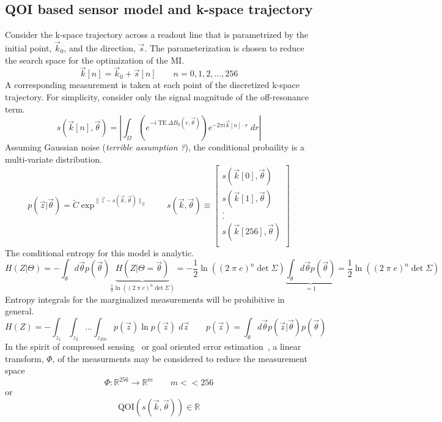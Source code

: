 \documentclass[10pt]{amsart}
\begin{document}
\subsection{QOI based sensor model and k-space trajectory}
Consider the k-space trajectory across a readout line that is
parametrized by the initial point, $\vec{k}_0$, and the direction, $\vec{s}$.
The parameterization is chosen to reduce the search space for the
optimization of the MI.
\[
   \vec{k}[n] = \vec{k}_0 +  \vec{s} [n] \qquad n = 0, 1, 2, ..., 256 
\]
A corresponding measurement is taken at each point of the
discretized k-space trajectory. For simplicity, consider only the
signal magnitude of the off-resonance term.
\[
 s(\vec{k}[n], \vec{\theta} ) 
          =  \left| 
     \int_\Omega \left(
     e^{- i\; \text{TE} \; \Delta B_{0}(r, \vec{\theta} ) }
           \right)
          e^{-2  \pi i \vec{k}[n]  \cdot r } 
             \; dr
             \right| 
\]
Assuming Gaussian noise (\textit{terrible assumption ?}), 
the conditional probaility is a multi-variate distribution.
\[
  p(\vec{z}|\vec{\theta}) = 
    \tilde{C} \exp^{\|\vec{z}- s(\vec{k},\vec{\theta} ) \|_\Sigma}
  \qquad
   s(\vec{k},\vec{\theta} )  \equiv
\begin{bmatrix}
  s(\vec{k}[ 0]  , \vec{\theta}  ) \\
  s(\vec{k}[ 1]  , \vec{\theta}  ) \\
   .                         \\
   .                         \\
  s(\vec{k}[ 256], \vec{\theta}  ) \\
\end{bmatrix}
\]
The conditional entropy for this model is analytic.
\[
H(Z|\Theta) =
     - 
       \int_{\theta}  d \vec{\theta}
       p(\vec{\theta}) 
       \underbrace{ 
       H(Z|\Theta = \vec{\theta}) }_{
          \frac{1}{2} \ln \left((2 \; \pi \; e)^n \det \Sigma   \right) 
         }
     = 
     - \frac{1}{2} \ln \left((2 \; \pi \; e)^n  \det \Sigma \right) 
       \underbrace{ 
       \int_{\theta}  d \vec{\theta}
       p(\vec{\theta}) 
        }_{ = 1}
     = 
          \frac{1}{2} \ln \left((2 \; \pi \; e)^n   \det\Sigma \right) 
\]
Entropy integrals for the marginalized measurements will be prohibitive in
general.
\[
H(Z) = 
  -\int_{z_1} \int_{z_2} ...  \int_{z_{256}}
    p(\vec{z}) \ln p(\vec{z}) 
    \; d \vec{z}
\qquad
  p(\vec{z})  = \int_\theta d \vec{\theta} 
  p(\vec{z}|\vec{\theta}) p(\vec{\theta})  
\]
In the spirit of compressed sensing~\cite{Fessler2010b,Donoho2006a,Candes2008}
or goal oriented error estimation~\cite{prudhomme1999goal}, 
a linear transform, $\Phi$, of the measurments may be considered to reduce the
measurement space
\[
    \Phi: \mathbb{R}^{256} \rightarrow \mathbb{R}^m
 \qquad 
 m << 256
\]
or 
\[
  \text{QOI}(s(\vec{k},\vec{\theta} )) \in  \mathbb{R}
\]
\end{document}
